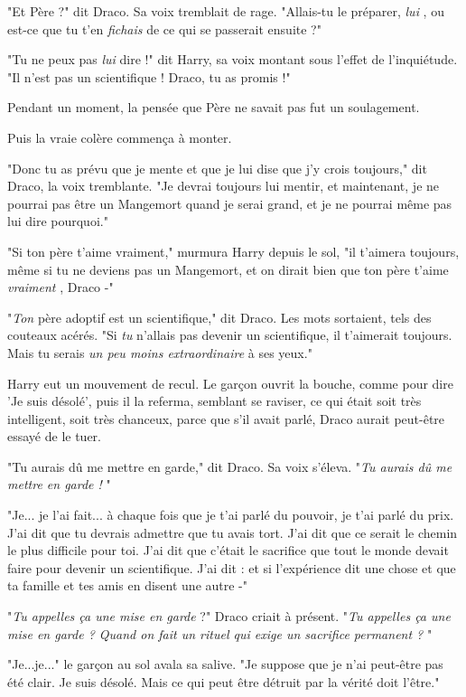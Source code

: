 "Et Père ?" dit Draco. Sa voix tremblait de rage. "Allais-tu le préparer, \emph{lui} , ou est-ce que tu t'en \emph{fichais}  de ce qui se passerait ensuite ?"

"Tu ne peux pas \emph{lui}  dire !" dit Harry, sa voix montant sous l'effet de l'inquiétude. "Il n'est pas un scientifique ! Draco, tu as promis !"

Pendant un moment, la pensée que Père ne savait pas fut un soulagement.

Puis la vraie colère commença à monter.

"Donc tu as prévu que je mente et que je lui dise que j'y crois toujours," dit Draco, la voix tremblante. "Je devrai toujours lui mentir, et maintenant, je ne pourrai pas être un Mangemort quand je serai grand, et je ne pourrai même pas lui dire pourquoi."

"Si ton père t'aime vraiment," murmura Harry depuis le sol, "il t'aimera toujours, même si tu ne deviens pas un Mangemort, et on dirait bien que ton père t'aime \emph{vraiment} , Draco -"

"\emph{Ton}  père adoptif est un scientifique," dit Draco. Les mots sortaient, tels des couteaux acérés. "Si \emph{tu}  n'allais pas devenir un scientifique, il t'aimerait toujours. Mais tu serais \emph{un peu moins extraordinaire}  à ses yeux."

Harry eut un mouvement de recul. Le garçon ouvrit la bouche, comme pour dire 'Je suis désolé', puis il la referma, semblant se raviser, ce qui était soit très intelligent, soit très chanceux, parce que s'il avait parlé, Draco aurait peut-être essayé de le tuer.

"Tu aurais dû me mettre en garde," dit Draco. Sa voix s'éleva. "\emph{Tu aurais dû me mettre en garde !} "

"Je... je l'ai fait... à chaque fois que je t'ai parlé du pouvoir, je t'ai parlé du prix. J'ai dit que tu devrais admettre que tu avais tort. J'ai dit que ce serait le chemin le plus difficile pour toi. J'ai dit que c'était le sacrifice que tout le monde devait faire pour devenir un scientifique. J'ai dit : et si l'expérience dit une chose et que ta famille et tes amis en disent une autre -"

"\emph{Tu appelles ça une mise en garde}  ?" Draco criait à présent. "\emph{Tu appelles ça une mise en garde ? Quand on fait un rituel qui exige un sacrifice permanent ?} "

"Je...je..." le garçon au sol avala sa salive. "Je suppose que je n'ai peut-être pas été clair. Je suis désolé. Mais ce qui peut être détruit par la vérité doit l'être."

